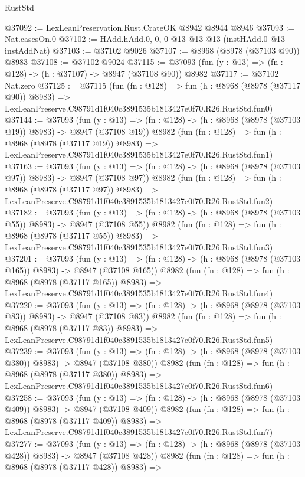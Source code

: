 \begin{lexlean}{RustStd}
\begin{coremodule}
@37092 := LexLeanPreservation.Rust.CrateOK @8942 @8944 @8946
@37093 := Nat.casesOn.{0}
@37102 := HAdd.hAdd.{0, 0, 0} @13 @13 @13 (instHAdd.{0} @13 instAddNat)
@37103 := @37102 @9026
@37107 := @8968 (@8978 (@37103 @90)) @8983
@37108 := @37102 @9024
@37115 := @37093 (fun (y : @13) => (fn : @128) -> (h : @37107) -> @8947 (@37108 @90)) @8982
@37117 := @37102 Nat.zero
@37125 := @37115
    (fun (fn : @128) =>
    fun (h : @8968 (@8978 (@37117 @90)) @8983) =>
    LexLeanPreserve.C98791d1f040c3891535b1813427e0f70.R26.RustStd.fun0)
@37144 := @37093
    (fun (y : @13) => (fn : @128) -> (h : @8968 (@8978 (@37103 @19)) @8983) -> @8947 (@37108 @19))
    @8982
    (fun (fn : @128) =>
    fun (h : @8968 (@8978 (@37117 @19)) @8983) =>
    LexLeanPreserve.C98791d1f040c3891535b1813427e0f70.R26.RustStd.fun1)
@37163 := @37093
    (fun (y : @13) => (fn : @128) -> (h : @8968 (@8978 (@37103 @97)) @8983) -> @8947 (@37108 @97))
    @8982
    (fun (fn : @128) =>
    fun (h : @8968 (@8978 (@37117 @97)) @8983) =>
    LexLeanPreserve.C98791d1f040c3891535b1813427e0f70.R26.RustStd.fun2)
@37182 := @37093
    (fun (y : @13) => (fn : @128) -> (h : @8968 (@8978 (@37103 @55)) @8983) -> @8947 (@37108 @55))
    @8982
    (fun (fn : @128) =>
    fun (h : @8968 (@8978 (@37117 @55)) @8983) =>
    LexLeanPreserve.C98791d1f040c3891535b1813427e0f70.R26.RustStd.fun3)
@37201 := @37093
    (fun (y : @13) => (fn : @128) -> (h : @8968 (@8978 (@37103 @165)) @8983) -> @8947 (@37108 @165))
    @8982
    (fun (fn : @128) =>
    fun (h : @8968 (@8978 (@37117 @165)) @8983) =>
    LexLeanPreserve.C98791d1f040c3891535b1813427e0f70.R26.RustStd.fun4)
@37220 := @37093
    (fun (y : @13) => (fn : @128) -> (h : @8968 (@8978 (@37103 @83)) @8983) -> @8947 (@37108 @83))
    @8982
    (fun (fn : @128) =>
    fun (h : @8968 (@8978 (@37117 @83)) @8983) =>
    LexLeanPreserve.C98791d1f040c3891535b1813427e0f70.R26.RustStd.fun5)
@37239 := @37093
    (fun (y : @13) => (fn : @128) -> (h : @8968 (@8978 (@37103 @380)) @8983) -> @8947 (@37108 @380))
    @8982
    (fun (fn : @128) =>
    fun (h : @8968 (@8978 (@37117 @380)) @8983) =>
    LexLeanPreserve.C98791d1f040c3891535b1813427e0f70.R26.RustStd.fun6)
@37258 := @37093
    (fun (y : @13) => (fn : @128) -> (h : @8968 (@8978 (@37103 @409)) @8983) -> @8947 (@37108 @409))
    @8982
    (fun (fn : @128) =>
    fun (h : @8968 (@8978 (@37117 @409)) @8983) =>
    LexLeanPreserve.C98791d1f040c3891535b1813427e0f70.R26.RustStd.fun7)
@37277 := @37093
    (fun (y : @13) => (fn : @128) -> (h : @8968 (@8978 (@37103 @428)) @8983) -> @8947 (@37108 @428))
    @8982
    (fun (fn : @128) =>
    fun (h : @8968 (@8978 (@37117 @428)) @8983) =>

\end{coremodule}
\end{lexlean}
